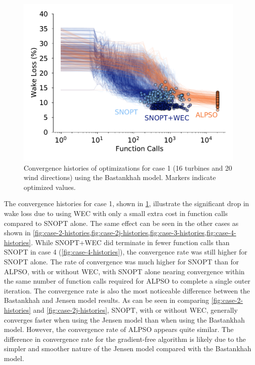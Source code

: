 \documentclass[journal abbreviation, manuscript]{copernicus}
\begin{document}
	\begin{figure}[h!]
		\centering
		\begin{minipage}[t]{.45\textwidth}
			\centering
			\includegraphics[width=\textwidth]{final_images/results/convergence_history_BPAmodel_16turbs_20dirs}  
			\caption{Convergence histories of optimizations for case 1 (16 turbines and 20 wind directions) using the Bastankhah model. Markers indicate optimized values.}
			\label{fig:case-1-histories}
		\end{minipage}
	\end{figure}
	
	The convergence histories for case 1, shown in \ref{fig:case-1-histories}, illustrate the significant drop in wake loss due to using WEC with only a small extra cost in function calls compared to SNOPT alone. The same effect can be seen in the other cases as shown in \ref{fig:case-2-histories,fig:case-2j-histories,fig:case-3-histories,fig:case-4-histories}. While SNOPT+WEC did terminate in fewer function calls than SNOPT in case 4 (\ref{fig:case-4-histories}), the convergence rate was still higher for SNOPT alone. The rate of convergence was much higher for SNOPT than for ALPSO, with or without WEC, with SNOPT alone nearing convergence within the same number of function calls required for ALPSO to complete a single outer iteration. The convergence rate is also the most noticeable difference between the Bastankhah and Jensen model results. As can be seen in comparing \ref{fig:case-2-histories} and \ref{fig:case-2j-histories}, SNOPT, with or without WEC, generally converges faster when using the Jensen model than when using the Bastankhah model. However, the convergence rate of ALPSO appears quite similar. The difference in convergence rate for the gradient-free algorithm is likely due to the simpler and smoother nature of the Jensen model compared with the Bastankhah model.
	
\end{document}
